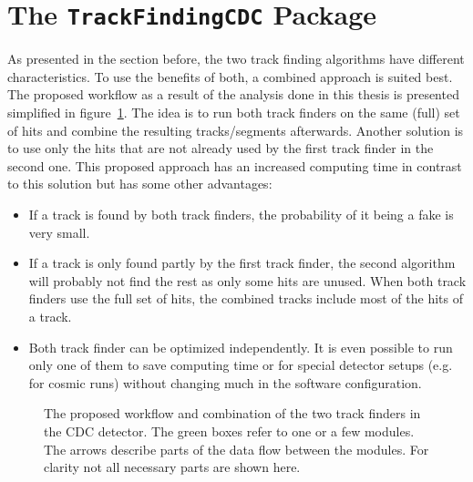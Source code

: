 \section{The \texttt{TrackFindingCDC} Package}
As presented in the section before, the two track finding algorithms have different characteristics. To use the benefits of both, a combined approach is suited best. The proposed workflow as a result of the analysis done in this thesis is presented simplified in figure~\ref{fig-workflow}. The idea is to run both track finders on the same (full) set of hits and combine the resulting tracks/segments afterwards. Another solution is to use only the hits that are not already used by the first track finder in the second one. This proposed approach has an increased computing time in contrast to this solution but has some other advantages: 
\begin{itemize}
 \item If a track is found by both track finders, the probability of it being a fake is very small.
 \item If a track is only found partly by the first track finder, the second algorithm will probably not find the rest as only some hits are unused. When both track finders use the full set of hits, the combined tracks include most of the hits of a track.
 \item Both track finder can be optimized independently. It is even possible to run only one of them to save computing time or for special detector setups (e.g. for cosmic runs) without changing much in the software configuration.
\end{itemize}

\begin{figure}
  \centering
 \caption[Proposed workflow in the CDC tracking]{The proposed workflow and combination of the two track finders in the CDC detector. The green boxes refer to one or a few modules. The arrows describe parts of the data flow between the modules. For clarity not all necessary parts are shown here.}
 \label{fig-workflow}
\end{figure}

